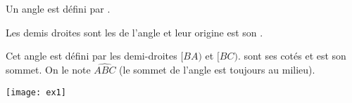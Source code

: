 

\begin{mydef}
	Un angle est défini par \hspace*{8cm}. 
	
	Les demis droites sont les \hspace{3cm} de l'angle et leur origine est son \hspace{4cm}.
\end{mydef}

\begin{myex}
	\begin{multicols}{2}
		Cet angle est défini par les demi-droites $[BA)$ et $[BC)$. \hspace*{4cm} sont ses cotés et \hspace{1cm} est son sommet.
		On le note $\widehat{ABC}$ (le sommet de l'angle est toujours au milieu).
		
		\texttt{[image: ex1]}
	\end{multicols}
\end{myex}